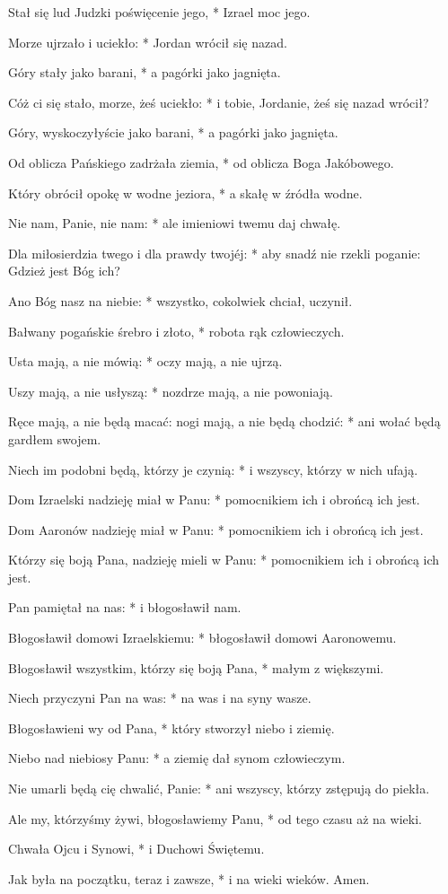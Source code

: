 ﻿\item Stał się lud Judzki poświęcenie jego, * Izrael moc jego.
\item Morze ujrzało i uciekło: * Jordan wrócił się nazad.
\item Góry stały jako barani, * a pagórki jako jagnięta.
\item Cóż ci się stało, morze, żeś uciekło: * i tobie, Jordanie, żeś się nazad wrócił?
\item Góry, wyskoczyłyście jako barani, * a pagórki jako jagnięta.
\item Od oblicza Pańskiego zadrżała ziemia, * od oblicza Boga Jakóbowego.
\item Który obrócił opokę w wodne jeziora, * a skałę w źródła wodne.
\item Nie nam, Panie, nie nam: * ale imieniowi twemu daj chwałę.
\item  Dla miłosierdzia twego i dla prawdy twojéj: * aby snadź nie rzekli poganie: Gdzież jest Bóg ich?
\item  Ano Bóg nasz na niebie: * wszystko, cokolwiek chciał, uczynił.
\item  Bałwany pogańskie śrebro i złoto, * robota rąk człowieczych.
\item  Usta mają, a nie mówią: * oczy mają, a nie ujrzą.
\item  Uszy mają, a nie usłyszą: * nozdrze mają, a nie powoniają.
\item  Ręce mają, a nie będą macać: nogi mają, a nie będą chodzić: * ani wołać będą gardłem swojem.
\item  Niech im podobni będą, którzy je czynią: * i wszyscy, którzy w nich ufają.
\item  Dom Izraelski nadzieję miał w Panu: * pomocnikiem ich i obrońcą ich jest.
\item  Dom Aaronów nadzieję miał w Panu: * pomocnikiem ich i obrońcą ich jest.
\item  Którzy się boją Pana, nadzieję mieli w Panu: * pomocnikiem ich i obrońcą ich jest.
\item  Pan pamiętał na nas: * i błogosławił nam.
\item  Błogosławił domowi Izraelskiemu: * błogosławił domowi Aaronowemu.
\item  Błogosławił wszystkim, którzy się boją Pana, * małym z większymi.
\item  Niech przyczyni Pan na was: * na was i na syny wasze.
\item  Błogosławieni wy od Pana, * który stworzył niebo i ziemię.
\item  Niebo nad niebiosy Panu: * a ziemię dał synom człowieczym.
\item  Nie umarli będą cię chwalić, Panie: * ani wszyscy, którzy zstępują do piekła.
\item  Ale my, którzyśmy żywi, błogosławiemy Panu, * od tego czasu aż na wieki.
\item Chwała Ojcu i Synowi, * i Duchowi Świętemu.
\item Jak była na początku, teraz i zawsze, * i na wieki wieków. Amen.